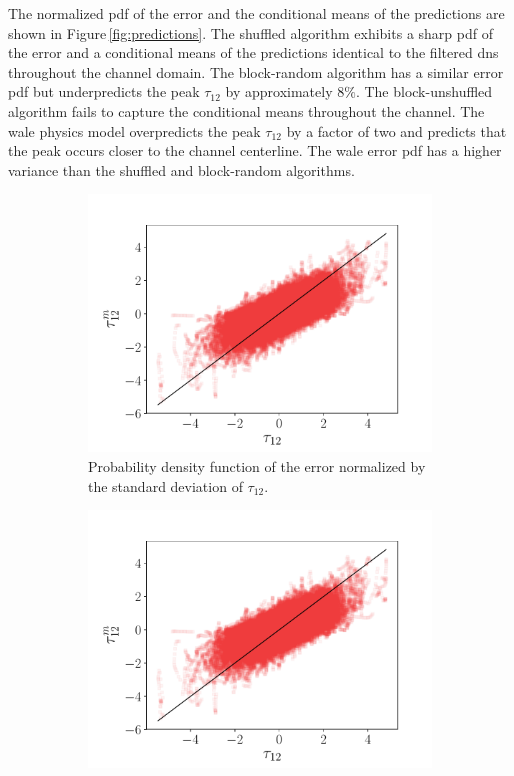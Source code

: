 \documentclass[review]{elsarticle}
\begin{document}
The normalized \gls{pdf} of the error and the conditional means of the
predictions are shown in Figure\,\ref{fig:predictions}. The shuffled
algorithm exhibits a sharp \gls{pdf} of the error and a conditional
means of the predictions identical to the filtered \gls{dns}
throughout the channel domain. The block-random algorithm has a
similar error \gls{pdf} but underpredicts the peak $\tau_{12}$ by
approximately $8\%$. The block-unshuffled algorithm fails to capture the
conditional means throughout the channel. The \gls{wale} physics model
overpredicts the peak $\tau_{12}$ by a factor of two and predicts that
the peak occurs closer to the channel centerline. The \gls{wale} error
\gls{pdf} has a higher variance than the shuffled and block-random
algorithms.

\begin{figure}[!tbp]%
  \centering%
  \begin{subfigure}[t]{0.48\textwidth}%
    \includegraphics[page=4, width=\textwidth]{./figs/predictions.pdf}%
    \caption{Probability density function of the error normalized by the standard deviation of $\tau_{12}$.}%
  \end{subfigure}\hfill%
  \begin{subfigure}[t]{0.48\textwidth}%
    \includegraphics[page=17, width=\textwidth]{./figs/predictions.pdf}%

\end{subfigure}
\end{figure}
\end{document}
